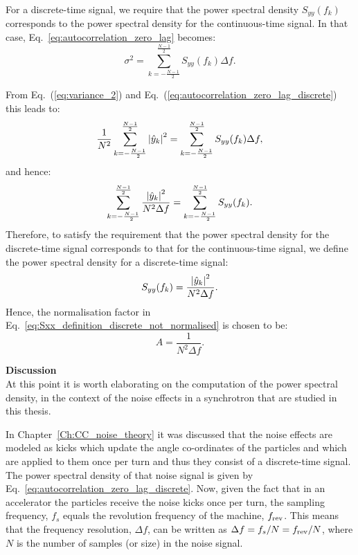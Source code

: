 For a discrete-time signal, we require that the power spectral density $S_{yy}(f_k)$ corresponds to the power spectral density for the continuous-time signal. In that case, Eq.~\eqref{eq:autocorrelation_zero_lag}
becomes:
\begin{equation}\label{eq:autocorrelation_zero_lag_discrete}
\sigma^2 =  \sum_{k=-\frac{N-1}{2}}^{\frac{N-1}{2}} S_{yy}(f_k) \Delta f.
\end{equation}

From Eq.~(\ref{eq:variance_2}) and Eq.~(\ref{eq:autocorrelation_zero_lag_discrete}) this leads to:
\begin{equation}\label{eq:normalisation_test}
 \frac{1}{N^2}\sum_{k=-\frac{N-1}{2}}^{\frac{N-1}{2}} \left | \hat{y}_k \right |^2 =  \sum_{k=-\frac{N-1}{2}}^{\frac{N-1}{2}} S_{yy}(f_k) \Delta f,
\end{equation} %
and hence:
\begin{equation}
  \sum_{k=-\frac{N-1}{2}}^{\frac{N-1}{2}} \frac{\left | \hat{y}_k \right |^2}{N^2 \Delta f} =  \sum_{k=-\frac{N-1}{2}}^{\frac{N-1}{2}} S_{yy}(f_k).
\end{equation}
Therefore, to satisfy the requirement that the power spectral density for the discrete-time signal corresponds to that for the continuous-time signal, we define the power spectral density for a discrete-time signal:
\begin{equation}
    S_{yy}(f_k) = \frac{\left | \hat{y}_k \right |^2}{N^2 \Delta f}.
\end{equation}
Hence, the normalisation factor in Eq.~\eqref{eq:Sxx_definition_discrete_not_normalised} is chosen to be:
\begin{equation}
    A=\frac{1}{N^2 \Delta f}.
\end{equation}

\textbf{Discussion}\\
At this point it is worth elaborating on the computation of the power spectral density, in the context of the noise effects in a synchrotron that are studied in this thesis.

In Chapter~\ref{Ch:CC_noise_theory} it was discussed that the noise effects are modeled as kicks which update the angle co-ordinates of the particles and which are applied to them once per turn and thus they consist of a discrete-time signal. The power spectral density of that noise signal is given by Eq.~\eqref{eq:autocorrelation_zero_lag_discrete}.  Now, given the fact that in an accelerator the particles receive the noise kicks once per turn, the sampling frequency, $f_s$ equals the revolution frequency of the machine, ${f_\mathrm{rev}}$. This means that the frequency resolution, $\Delta f$, can be written as $\Delta f = f_s/N = {f_\mathrm{rev}}/N$, where $N$ is the number of samples (or size) in the noise signal. 

